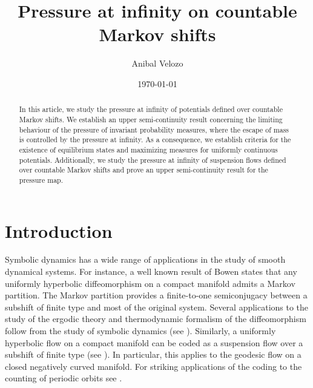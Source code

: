 \documentclass[letterpaper,11pt]{amsart}
\theoremstyle{plain}
\theoremstyle{plain}
\theoremstyle{definition}
\theoremstyle{remark}
\begin{document}
	
	

\title{Pressure at infinity on countable Markov shifts}
\date{\today}




 \author[A.Velozo]{Anibal Velozo}  \address{Facultad de Matem\'aticas, Pontificia Universidad Cat\'olica de Chile, Avenida Vicu\~na Mackenna 4860, Santiago, Chile.}




\begin{abstract}
In this article, we study the pressure at infinity of potentials defined over countable Markov shifts. We establish an upper semi-continuity result concerning the limiting behaviour of the pressure of invariant probability measures, where the escape of mass is controlled by the pressure at infinity. As a consequence, we establish criteria for the existence of equilibrium states and maximizing measures for uniformly continuous potentials. Additionally, we study the pressure at infinity of suspension flows defined over countable Markov shifts and prove an upper semi-continuity result for the pressure map. 
\end{abstract}

\maketitle

\setcounter{tocdepth}{1}
\tableofcontents


\section{Introduction}

Symbolic dynamics has a wide range of applications in the study of smooth dynamical systems.   For instance, a well known result of Bowen \cite{bo0} states that any uniformly hyperbolic diffeomorphism on a compact  manifold admits a Markov partition. The Markov partition provides a finite-to-one semiconjugacy between a subshift of finite type and most of the original system. Several applications to the study of the ergodic theory and thermodynamic formalism of the diffeomorphism follow from the study of symbolic dynamics (see \cite{bo2}). Similarly, a uniformly hyperbolic flow on a compact manifold can be coded as a suspension flow over a subshift of finite type (see \cite{bo3,ra}). In particular, this applies to the geodesic flow on a closed negatively curved manifold. For striking applications of the coding to the counting of periodic orbits see \cite{pp, la}. 
\end{document}
